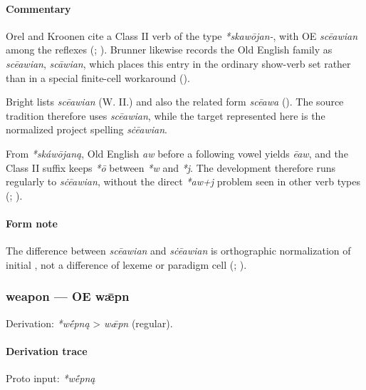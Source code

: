 \documentclass[
  british,
  a4paper,
]{article}
\begin{document}
\paragraph{Commentary}\label{commentary-10}

Orel and Kroonen cite a Class II verb of the type \emph{*skawōjan-},
with OE \emph{scēawian} among the reflexes (; ). Brunner likewise
records the Old English family as \emph{scēawian}, \emph{scāwian}, which
places this entry in the ordinary show-verb set rather than in a special
finite-cell workaround ().

Bright lists \emph{scēawian} (W. II.) and also the related form
\emph{scēawa} ().
The source tradition therefore uses \emph{scēawian}, while the target
represented here is the normalized project spelling \emph{sċēawian}.

From \emph{*skáwōjaną}, Old English \emph{aw} before a following vowel
yields \emph{ēaw}, and the Class II suffix keeps \emph{*ō} between
\emph{*w} and \emph{*j}. The development therefore runs regularly to
\emph{sċēawian}, without the direct \emph{*aw+j} problem seen in other
verb types (;
).

\paragraph{Form note}\label{form-note-4}

The difference between \emph{scēawian} and \emph{sċēawian} is
orthographic normalization of initial \emph{}, not a difference of
lexeme or paradigm cell (;
).

\subsubsection{weapon --- OE wǣpn}\label{weapon-oe-wux1e3pn-1}

Derivation: \emph{*wḗpną} \textgreater{} \emph{wǣpn} (regular).

\paragraph{Derivation trace}\label{derivation-trace-23}

Proto input: \emph{*wḗpną}
\end{document}
